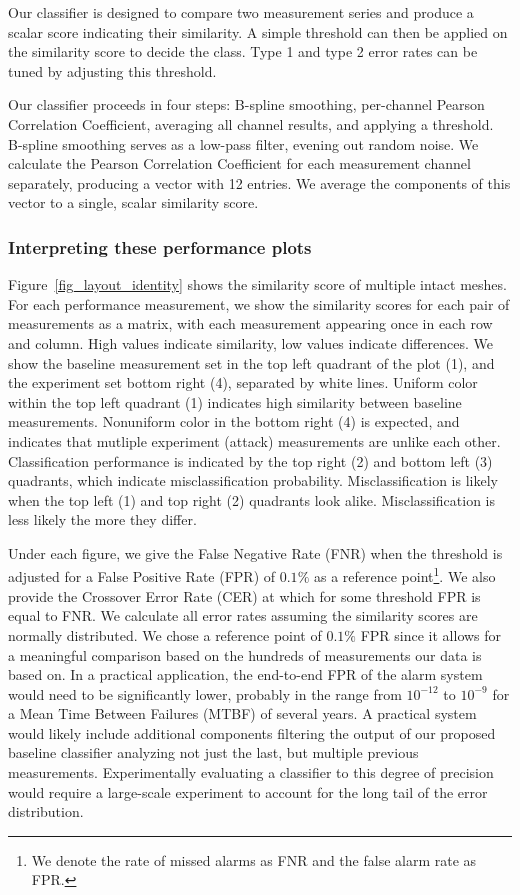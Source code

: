 \documentclass[final]{iacrtrans}
\begin{document}
Our classifier is designed to compare two measurement series and produce a scalar score indicating their similarity. A
simple threshold can then be applied on the similarity score to decide the class. Type 1 and type 2 error rates can be
tuned by adjusting this threshold.

Our classifier proceeds in four steps: B-spline smoothing, per-channel Pearson Correlation Coefficient, averaging all
channel results, and applying a threshold. B-spline smoothing serves as a low-pass filter, evening out random noise. We
calculate the Pearson Correlation Coefficient for each measurement channel separately, producing a vector with 12
entries. We average the components of this vector to a single, scalar similarity score.

\subsubsection{Interpreting these performance plots}
Figure~\ref{fig_layout_identity} shows the similarity score of multiple intact meshes. For each performance measurement,
we show the similarity scores for each pair of measurements as a matrix, with each measurement appearing once in each
row and column. High values indicate similarity, low values indicate differences. We show the baseline measurement set
in the top left quadrant of the plot (1), and the experiment set bottom right (4), separated by white lines. Uniform
color within the top left quadrant (1) indicates high similarity between baseline measurements. Nonuniform color in the
bottom right (4) is expected, and indicates that mutliple experiment (attack) measurements are unlike each other.
Classification performance is indicated by the top right (2) and bottom left (3) quadrants, which indicate
misclassification probability. Misclassification is likely when the top left (1) and top right (2) quadrants look alike.
Misclassification is less likely the more they differ.

Under each figure, we give the False Negative Rate (FNR) when the threshold is adjusted for a False Positive Rate (FPR)
of $0.1\%$ as a reference point\footnote{We denote the rate of missed alarms as FNR and the false alarm rate as FPR.}.
We also provide the Crossover Error Rate (CER) at which for some threshold FPR is equal to FNR. We calculate all error
rates assuming the similarity scores are normally distributed. We chose a reference point of $0.1\%$ FPR since it allows
for a meaningful comparison based on the hundreds of measurements our data is based on. In a practical application, the
end-to-end FPR of the alarm system would need to be significantly lower, probably in the range from $10^{-12}$ to
$10^{-9}$ for a Mean Time Between Failures (MTBF) of several years. A practical system would likely include additional
components filtering the output of our proposed baseline classifier analyzing not just the last, but multiple previous
measurements. Experimentally evaluating a classifier to this degree of precision would require a large-scale experiment
to account for the long tail of the error distribution.
\end{document}
